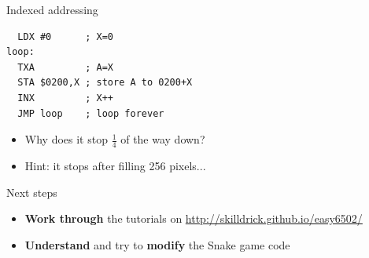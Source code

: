 \begin{frame}[fragile]{Indexed addressing}
	\begin{lstlisting}
  LDX #0      ; X=0
loop:
  TXA         ; A=X
  STA $0200,X ; store A to 0200+X
  INX         ; X++
  JMP loop    ; loop forever
	\end{lstlisting}
	\begin{itemize}
		\pause\item Why does it stop $\frac14$ of the way down?
		\pause\item Hint: it stops after filling 256 pixels...
	\end{itemize}
\end{frame}

\begin{frame}{Next steps}
	\begin{itemize}
		\pause\item \textbf{Work through} the tutorials on \url{http://skilldrick.github.io/easy6502/}
		\pause\item \textbf{Understand} and try to \textbf{modify} the Snake game code
	\end{itemize}
\end{frame}
